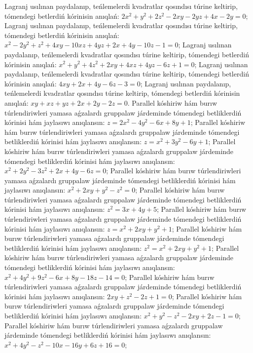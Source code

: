 Lagranj usılınan paydalanıp, teńlemelerdi kvadratlar qosındısı túrine keltirip, tómendegi betlerdiń kórinisin anıqlań: $2 x^2+y^2+2 z^2-2 x y-2 y z+4 x-2 y=0$;
Lagranj usılınan paydalanıp, teńlemelerdi kvadratlar qosındısı túrine keltirip, tómendegi betlerdiń kórinisin anıqlań: $x^2-2 y^2+z^2+4 x y-10 x z+4 y z+2 x+4 y-10 z-1=0$;
Lagranj usılınan paydalanıp, teńlemelerdi kvadratlar qosındısı túrine keltirip, tómendegi betlerdiń kórinisin anıqlań: $x^2+y^2+4 z^2+2 x y+4 x z+4 y z-6 z+1=0$;
Lagranj usılınan paydalanıp, teńlemelerdi kvadratlar qosındısı túrine keltirip, tómendegi betlerdiń kórinisin anıqlań: $4 x y+2 x+4 y-6 z-3=0$;
Lagranj usılınan paydalanıp, teńlemelerdi kvadratlar qosındısı túrine keltirip, tómendegi betlerdiń kórinisin anıqlań: $x y+x z+y z+2 x+2 y-2 z=0$.
Parallel kóshiriw hám burıw túrlendiriwleri yamasa aǵzalardı gruppalaw járdeminde tómendegi betliklerdiń kórinisi hám jaylasıwı anıqlansın: $z=2 x^2-4 y^2-6 x+8 y+1$;
Parallel kóshiriw hám burıw túrlendiriwleri yamasa aǵzalardı gruppalaw járdeminde tómendegi betliklerdiń kórinisi hám jaylasıwı anıqlansın: $z=x^2+3 y^2-6 y+1$;
Parallel kóshiriw hám burıw túrlendiriwleri yamasa aǵzalardı gruppalaw járdeminde tómendegi betliklerdiń kórinisi hám jaylasıwı anıqlansın: $x^2+2 y^2-3 z^2+2 x+4 y-6 z=0$;
Parallel kóshiriw hám burıw túrlendiriwleri yamasa aǵzalardı gruppalaw járdeminde tómendegi betliklerdiń kórinisi hám jaylasıwı anıqlansın: $x^2+2 x y+y^2-z^2=0$;
Parallel kóshiriw hám burıw túrlendiriwleri yamasa aǵzalardı gruppalaw járdeminde tómendegi betliklerdiń kórinisi hám jaylasıwı anıqlansın: $z^2=3 x+4 y+5$;
Parallel kóshiriw hám burıw túrlendiriwleri yamasa aǵzalardı gruppalaw járdeminde tómendegi betliklerdiń kórinisi hám jaylasıwı anıqlansın: $z=x^2+2 x y+y^2+1$;
Parallel kóshiriw hám burıw túrlendiriwleri yamasa aǵzalardı gruppalaw járdeminde tómendegi betliklerdiń kórinisi hám jaylasıwı anıqlansın: $z^2=x^2+2 x y+y^2+1$;
Parallel kóshiriw hám burıw túrlendiriwleri yamasa aǵzalardı gruppalaw járdeminde tómendegi betliklerdiń kórinisi hám jaylasıwı anıqlansın: $x^2+4 y^2+9 z^2-6 x+8 y-18 z-14=0$;
Parallel kóshiriw hám burıw túrlendiriwleri yamasa aǵzalardı gruppalaw járdeminde tómendegi betliklerdiń kórinisi hám jaylasıwı anıqlansın: $2 x y+z^2-2 z+1=0$;
Parallel kóshiriw hám burıw túrlendiriwleri yamasa aǵzalardı gruppalaw járdeminde tómendegi betliklerdiń kórinisi hám jaylasıwı anıqlansın: $x^2+y^2-z^2-2 x y+2 z-1=0$;
Parallel kóshiriw hám burıw túrlendiriwleri yamasa aǵzalardı gruppalaw járdeminde tómendegi betliklerdiń kórinisi hám jaylasıwı anıqlansın: $x^2+4 y^2-z^2-10 x-16 y+6 z+16=0$;
